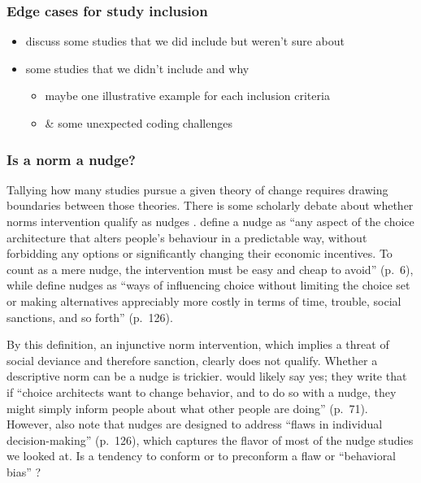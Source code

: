 \documentclass[sn-nature,pdflatex]{sn-jnl}
\begin{document}
\subsubsection{Edge cases for study
inclusion}\label{edge-cases-for-study-inclusion}

\begin{itemize}
\item
  discuss some studies that we did include but weren't sure about
\item
  some studies that we didn't include and why

  \begin{itemize}
  \item
    maybe one illustrative example for each inclusion criteria
  \item
    \& some unexpected coding challenges
  \end{itemize}
\end{itemize}

\subsubsection{Is a norm a nudge?}\label{is-a-norm-a-nudge}

Tallying how many studies pursue a given theory of change requires
drawing boundaries between those theories. There is some scholarly
debate about whether norms intervention qualify as nudges
\citep{bicchieri2023} . \citep{thaler2009} define a nudge as ``any
aspect of the choice architecture that alters people's behaviour in a
predictable way, without forbidding any options or significantly
changing their economic incentives. To count as a mere nudge, the
intervention must be easy and cheap to avoid'' (p.~6), while
\citep{hausman2010} define nudges as ``ways of influencing choice
without limiting the choice set or making alternatives appreciably more
costly in terms of time, trouble, social sanctions, and so forth''
(p.~126).

By this definition, an injunctive norm intervention, which implies a
threat of social deviance and therefore sanction, clearly does not
qualify. Whether a descriptive norm can be a nudge is trickier.
\citep{thaler2009} would likely say yes; they write that if ``choice
architects want to change behavior, and to do so with a nudge, they
might simply inform people about what other people are doing'' (p.~71).
However, \citep{hausman2010} also note that nudges are designed to
address ``flaws in individual decision-making'' (p.~126), which captures
the flavor of most of the nudge studies we looked at. Is a tendency to
conform or to preconform \citep{sparkman2017} a flaw or ``behavioral
bias'' \citep[362]{kantorowicz2021}?
\end{document}
